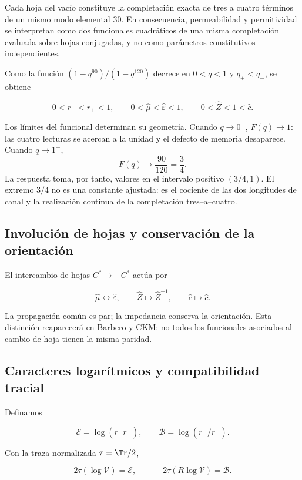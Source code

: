 Cada hoja del vac\'io constituye la completaci\'on exacta de tres a cuatro
t\'erminos de un mismo modo elemental \(30\). En consecuencia, permeabilidad
y permitividad se interpretan como dos funcionales cuadr\'aticos de una misma
completaci\'on evaluada sobre hojas conjugadas, y no como par\'ametros
constitutivos independientes.

Como la funci\'on \((1-q^{90})/(1-q^{120})\) decrece en \(0<q<1\) y \(q_+<q_-\), se obtiene

\[
0<r_-<r_+<1,\qquad
0<\widehat\mu<\widehat\varepsilon<1,\qquad
0<\widehat Z<1<\widehat c.
\]

Los l\'imites del funcional determinan su geometr\'ia. Cuando \(q\to0^+\),
\(F(q)\to1\): las cuatro lecturas se acercan a la unidad y el defecto de
memoria desaparece. Cuando \(q\to1^-\),
\[
F(q)\longrightarrow\frac{90}{120}=\frac34.
\]
La respuesta toma, por tanto, valores en el intervalo positivo \((3/4,1)\). El
extremo \(3/4\) no es una constante ajustada: es el cociente de las dos
longitudes de canal y la realizaci\'on continua de la completaci\'on
tres--a--cuatro.

\subsection{Involuci\'on de hojas y conservaci\'on de la orientaci\'on}

El intercambio de hojas \(C^*\mapsto-C^*\) act\'ua por

\begin{equation}
\widehat\mu\longleftrightarrow\widehat\varepsilon,\qquad
\widehat Z\longmapsto\widehat Z^{-1},
\qquad
\widehat c\longmapsto\widehat c.
\label{p12-83-c13-s1:eq:vacuum-sheet}
\end{equation}

La propagaci\'on com\'un es par; la impedancia conserva la orientaci\'on.
Esta distinci\'on reaparecer\'a en Barbero y CKM: no todos los funcionales
asociados al cambio de hoja tienen la misma paridad.

\subsection{Caracteres logar\'itmicos y compatibilidad tracial}

Definamos

\[
\mathcal E=\log(r_+r_-),\qquad
\mathcal B=\log(r_-/r_+).
\]

Con la traza normalizada \(\tau=\Tr/2\),

\begin{equation}
2\tau(\log\mathcal V)=\mathcal E,
\qquad
-2\tau(R\log\mathcal V)=\mathcal B.
\label{p12-83-c13-s1:eq:vacuum-traces}
\end{equation}


